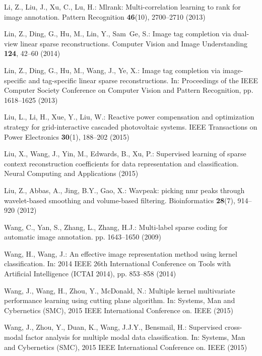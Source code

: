 \documentclass[runningheads,a4paper]{llncs}
\begin{document}
\begin{thebibliography}{10}
Li, Z., Liu, J., Xu, C., Lu, H.: Mlrank: Multi-correlation learning to rank for
  image annotation.
\newblock Pattern Recognition \textbf{46}(10), 2700--2710 (2013)

Lin, Z., Ding, G., Hu, M., Lin, Y., Sam~Ge, S.: Image tag completion via
  dual-view linear sparse reconstructions.
\newblock Computer Vision and Image Understanding \textbf{124}, 42--60 (2014)

Lin, Z., Ding, G., Hu, M., Wang, J., Ye, X.: Image tag completion via
  image-specific and tag-specific linear sparse reconstructions.
\newblock In: Proceedings of the IEEE Computer Society Conference on Computer
  Vision and Pattern Recognition, pp. 1618--1625 (2013)

Liu, L., Li, H., Xue, Y., Liu, W.: Reactive power compensation and optimization
  strategy for grid-interactive cascaded photovoltaic systems.
\newblock IEEE Transactions on Power Electronics \textbf{30}(1), 188--202
  (2015)

Liu, X., Wang, J., Yin, M., Edwards, B., Xu, P.: Supervised learning of sparse
  context reconstruction coefficients for data representation and
  classification.
\newblock Neural Computing and Applications  (2015)

Liu, Z., Abbas, A., Jing, B.Y., Gao, X.: Wavpeak: picking nmr peaks through
  wavelet-based smoothing and volume-based filtering.
\newblock Bioinformatics \textbf{28}(7), 914--920 (2012)

Wang, C., Yan, S., Zhang, L., Zhang, H.J.: Multi-label sparse coding for
  automatic image annotation.
\newblock pp. 1643--1650 (2009)

Wang, H., Wang, J.: An effective image representation method using kernel
  classification.
\newblock In: 2014 IEEE 26th International Conference on Tools with Artificial
  Intelligence (ICTAI 2014), pp. 853--858 (2014)

Wang, J., Wang, H., Zhou, Y., McDonald, N.: Multiple kernel multivariate
  performance learning using cutting plane algorithm.
\newblock In: Systems, Man and Cybernetics (SMC), 2015 IEEE International
  Conference on. IEEE (2015)

Wang, J., Zhou, Y., Duan, K., Wang, J.J.Y., Bensmail, H.: Supervised
  cross-modal factor analysis for multiple modal data classification.
\newblock In: Systems, Man and Cybernetics (SMC), 2015 IEEE International
  Conference on. IEEE (2015)


\end{thebibliography}
\end{document}
